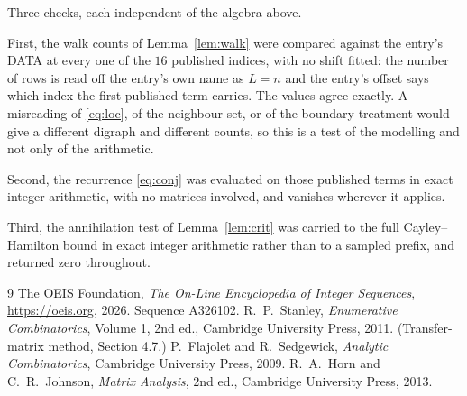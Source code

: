 \documentclass[11pt,a4paper]{article}
\theoremstyle{plain}
\theoremstyle{definition}
\begin{document}
Three checks, each independent of the algebra above.

First, the walk counts of Lemma~\ref{lem:walk} were compared against the entry's DATA at
every one of the $16$ published indices, with no shift fitted: the number of rows is
read off the entry's own name as $L=n$ and the entry's offset says which index the first
published term carries. The values agree exactly. A misreading of \eqref{eq:loc}, of the
neighbour set, or of the boundary treatment would give a different digraph and different
counts, so this is a test of the modelling and not only of the arithmetic.

Second, the recurrence \eqref{eq:conj} was evaluated on those published terms in exact
integer arithmetic, with no matrices involved, and vanishes wherever it applies.

Third, the annihilation test of Lemma~\ref{lem:crit} was carried to the full
Cayley--Hamilton bound in exact integer arithmetic rather than to a sampled prefix, and
returned zero throughout.

\begin{thebibliography}{9}
 The OEIS Foundation, \emph{The On-Line Encyclopedia of Integer
Sequences}, \url{https://oeis.org}, 2026. Sequence A326102.
 R.~P.~Stanley, \emph{Enumerative Combinatorics}, Volume 1, 2nd ed.,
Cambridge University Press, 2011. (Transfer-matrix method, Section 4.7.)
 P.~Flajolet and R.~Sedgewick, \emph{Analytic Combinatorics}, Cambridge
University Press, 2009.
 R.~A.~Horn and C.~R.~Johnson, \emph{Matrix Analysis}, 2nd ed., Cambridge
University Press, 2013.
\end{thebibliography}
\end{document}
